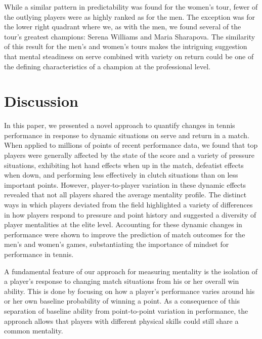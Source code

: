 \documentclass{Latex/svjour3}
\begin{document}
While a similar pattern in predictability was found for the women's tour, fewer
of the outlying players were as highly ranked as for the men. The exception was
for the lower right quadrant where we, as with the men, we found several of the
tour's greatest champions: Serena Williams and Maria Sharapova. The similarity
of this result for the men's and women's tours makes the intriguing suggestion
that mental steadiness on serve combined with variety on return could be one of
the defining characteristics of a champion at the professional level.



\section{Discussion}

In this paper, we presented a novel approach to quantify changes in tennis
performance in response to dynamic situations on serve and return in a
match. When applied to millions of points of recent performance data, we found
that top players were generally affected by the state of the score and a variety
of pressure situations, exhibiting hot hand effects when up in the match,
defeatist effects when down, and performing less effectively in clutch
situations than on less important points. However, player-to-player variation in
these dynamic effects revealed that not all players shared the average mentality
profile. The distinct ways in which players deviated from the field highlighted
a variety of differences in how players respond to pressure and point history
and suggested a diversity of player mentalities at the elite level. Accounting
for these dynamic changes in performance were shown to improve the prediction of
match outcomes for the men's and women's games, substantiating the importance of
mindset for performance in tennis.

A fundamental feature of our approach for measuring mentality is the isolation
of a player's response to changing match situations from his or her overall win
ability. This is done by focusing on how a player's performance varies around
his or her own baseline probability of winning a point. As a consequence of this
separation of baseline ability from point-to-point variation in performance, the
approach allows that players with different physical skills could still share a
common mentality. 
\end{document}
